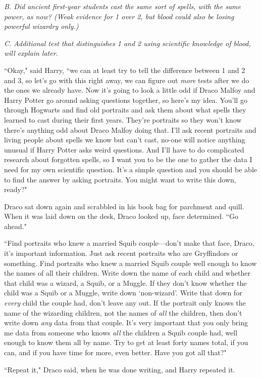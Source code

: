 \emph{B. Did ancient first-year students cast the same sort of spells, with the same power, as now? (Weak evidence for 1 over 2, but blood could also be losing powerful wizardry only.)}

\emph{C. Additional test that distinguishes 1 and 2 using scientific knowledge of blood, will explain later.}

``Okay," said Harry, ``we can at least try to tell the difference between 1 and 2 and 3, so let's go with this right away, we can figure out \emph{more} tests after we do the ones we already have. Now it's going to look a little odd if Draco Malfoy and Harry Potter go around asking questions together, so here's my idea. You'll go through Hogwarts and find old portraits and ask them about what spells they learned to cast during their first years. They're portraits so they won't know there's anything odd about Draco Malfoy doing that. I'll ask recent portraits and living people about spells we know but can't cast, no-one will notice anything unusual if Harry Potter asks weird questions. And I'll have to do complicated research about forgotten spells, so I want you to be the one to gather the data I need for my own scientific question. It's a simple question and you should be able to find the answer by asking portraits. You might want to write this down, ready?"

Draco sat down again and scrabbled in his book bag for parchment and quill. When it was laid down on the desk, Draco looked up, face determined. ``Go ahead."

``Find portraits who knew a married Squib couple—don't make that face, Draco, it's important information. Just ask recent portraits who are Gryffindors or something. Find portraits who knew a married Squib couple well enough to know the names of all their children. Write down the name of each child and whether that child was a wizard, a Squib, or a Muggle. If they don't know whether the child was a Squib or a Muggle, write down `non-wizard'. Write that down for \emph{every} child the couple had, don't leave any out. If the portrait only knows the name of the wizarding children, not the names of \emph{all} the children, then don't write down \emph{any} data from that couple. It's very important that you only bring me data from someone who knows \emph{all} the children a Squib couple had, well enough to know them all by name. Try to get at least forty names total, if you can, and if you have time for more, even better. Have you got all that?"

``Repeat it," Draco said, when he was done writing, and Harry repeated it.

